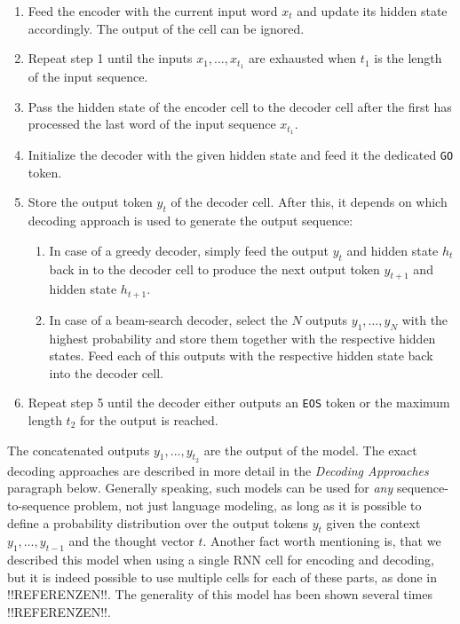 \begin{enumerate}
	\item Feed the encoder with the current input word $x_t$ and update its hidden state accordingly. The output of the cell can be ignored.
	\item Repeat step 1 until the inputs $x_1,\dots,x_{t_1}$ are exhausted when $t_1$ is the length of the input sequence.
	\item Pass the hidden state of the encoder cell to the decoder cell after the first has processed the last word of the input sequence $x_{t_1}$.
	\item Initialize the decoder with the given hidden state and feed it the dedicated \texttt{GO} token.
	\item Store the output token $y_t$ of the decoder cell. After this, it depends on which decoding approach is used to generate the output sequence:
	\begin{enumerate}
		\item In case of a greedy decoder, simply feed the output $y_t$ and hidden state $h_t$ back in to the decoder cell to produce the next output token $y_{t+1}$ and hidden state $h_{t+1}$.
		\item In case of a beam-search decoder, select the $N$ outputs $y_1,\dots,y_{N}$ with the highest probability and store them together with the respective hidden states. Feed each of this outputs with the respective hidden state back into the decoder cell.
	\end{enumerate}
	\item Repeat step 5 until the decoder either outputs an \texttt{EOS} token or the maximum length $t_2$ for the output is reached.
\end{enumerate}

The concatenated outputs $y_1,...,y_{t_2}$ are the output of the model. The exact decoding approaches are described in more detail in the \emph{Decoding Approaches} paragraph below. Generally speaking, such models can be used for \emph{any} sequence-to-sequence problem, not just language modeling, as long as it is possible to define a probability distribution over the output tokens $y_t$ given the context $y_1,\dots,y_{t-1}$ and the thought vector $t$. Another fact worth mentioning is, that we described this model when using a single RNN cell for encoding and decoding, but it is indeed possible to use multiple cells for each of these parts, as done in !!REFERENZEN!!. The generality of this model has been shown several times !!REFERENZEN!!.

